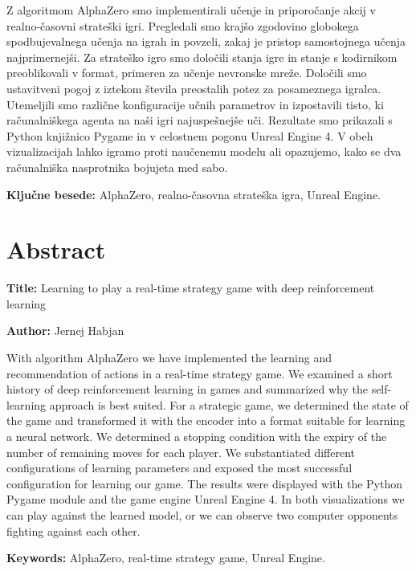 \documentclass[a4paper, 12pt]{book}
\newcommand{\ttitleEn}{Learning to play a real-time strategy game with deep reinforcement learning}
\newcommand{\tauthor}{Jernej Habjan}
\newcommand{\tkeywords}{AlphaZero, realno-časovna strateška igra, Unreal Engine}
\newcommand{\tkeywordsEn}{AlphaZero, real-time strategy game, Unreal Engine}
\newcommand{\clearemptydoublepage}{\newpage{\pagestyle{empty}\cleardoublepage}}
\begin{document}
\noindent 
Z algoritmom AlphaZero smo implementirali učenje in priporočanje akcij v realno-časovni strateški igri.
Pregledali smo krajšo zgodovino globokega spodbujevalnega učenja na igrah in povzeli, zakaj je pristop samostojnega učenja najprimernejši.
Za strateško igro smo določili stanja igre in stanje s kodirnikom preoblikovali v format, primeren za učenje nevronske mreže.
Določili smo ustavitveni pogoj z iztekom števila preostalih potez za posameznega igralca.
Utemeljili smo različne konfiguracije učnih parametrov in izpostavili tisto, ki računalniškega agenta na naši igri najuspešnejše uči.
Rezultate smo prikazali s Python knjižnico Pygame in v celostnem pogonu Unreal Engine 4. 
V obeh vizualizacijah lahko igramo proti naučenemu modelu ali opazujemo, kako se dva računalniška nasprotnika bojujeta med sabo.
\bigskip

\noindent\textbf{Ključne besede:} \tkeywords.
\clearemptydoublepage

\chapter*{Abstract}

\noindent\textbf{Title:} \ttitleEn
\bigskip

\noindent\textbf{Author:} \tauthor
\bigskip

\noindent With algorithm AlphaZero we have implemented the learning and recommendation of actions in a real-time strategy game.
We examined a short history of deep reinforcement learning in games and summarized why the self-learning approach is best suited.
For a strategic game, we determined the state of the game and transformed it with the encoder into a format suitable for learning a neural network.
We determined a stopping condition with the expiry of the number of remaining moves for each player.
We substantiated different configurations of learning parameters and exposed the most successful configuration for learning our game.
The results were displayed with the Python Pygame module and the game engine Unreal Engine 4.
In both visualizations we can play against the learned model, or we can observe two computer opponents fighting against each other.
\bigskip

\noindent\textbf{Keywords:} \tkeywordsEn.
\clearemptydoublepage
\end{document}
